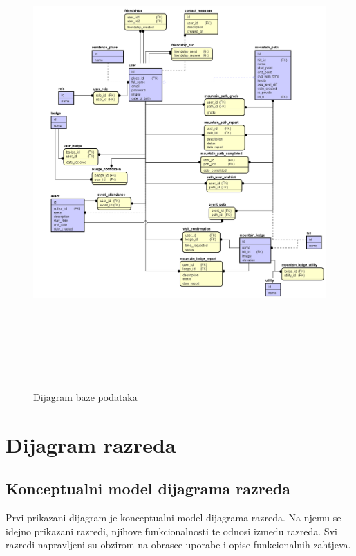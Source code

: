 				\begin{figure}[H]
					\includegraphics[scale=0.4, height=180mm]{slike/database.png} %
					\centering
					\caption{Dijagram baze podataka}
					\label{fig:slične aplikacije}
				\end{figure}
			
			\eject
			
			
		\section{Dijagram razreda}
		
			\subsection{Konceptualni model dijagrama razreda}
			Prvi prikazani dijagram je konceptualni model dijagrama razreda. Na njemu se idejno prikazani razredi, njihove funkcionalnosti te odnosi između razreda. Svi razredi napravljeni su obzirom na obrasce uporabe i opise funkcionalnih zahtjeva.
		
